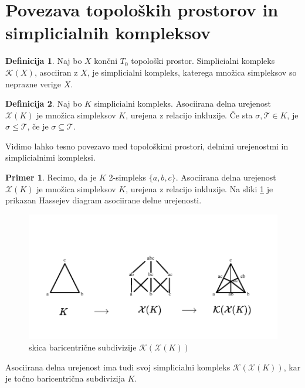 \documentclass[a4paper, 12pt]{book}
\theoremstyle{definition}
\newtheorem{definition}{Definicija}[section]
\newtheorem{example}{Primer}[section]
\theoremstyle{remark}
\begin{document}
\section{Povezava topoloških prostorov in simplicialnih kompleksov}
\begin{definition}
  Naj bo $X$ končni $T_0$ topološki prostor. Simplicialni kompleks $\mathcal{K}(X)$,
  asociiran z $X$, je simplicialni kompleks, katerega množica simpleksov so neprazne verige $X$.
\end{definition}
\begin{definition}\label{asociated-poset}
  Naj bo $K$ simplicialni kompleks. Asociirana delna urejenost $\mathcal{X}(K)$ je
  množica simpleksov $K$, urejena z relacijo inkluzije. Če sta $\sigma, \mathcal{T} \in K$,
  je $\sigma \leq \mathcal{T}$, če je $\sigma \subseteq \mathcal{T}$.
\end{definition}
Vidimo lahko tesno povezavo med topološkimi prostori, delnimi urejenostmi in
simplicialnimi kompleksi.
\begin{example}
Recimo, da je $K$ 2-simpleks $\{a,b,c\}$. Asociirana delna urejenost $\mathcal{X}(K)$
je množica simpleksov $K$, urejena z relacijo inkluzije. Na sliki \ref{baricent-asoc} je prikazan
Hassejev diagram asociirane delne urejenosti.
\begin{figure}[h]
  \begin{center}
  \includegraphics[width=1\textwidth]{baricent-asoc.pdf}
  \end{center}
  \caption{skica baricentrične subdivizije $\mathcal{K}(\mathcal{X}(K))$}
  \label{baricent-asoc}
\end{figure}
  Asociirana delna urejenost ima tudi
svoj simplicialni kompleks $\mathcal{K}(\mathcal{X}(K))$, kar je točno
baricentrična subdivizija $K$.
\end{example}
\end{document}
